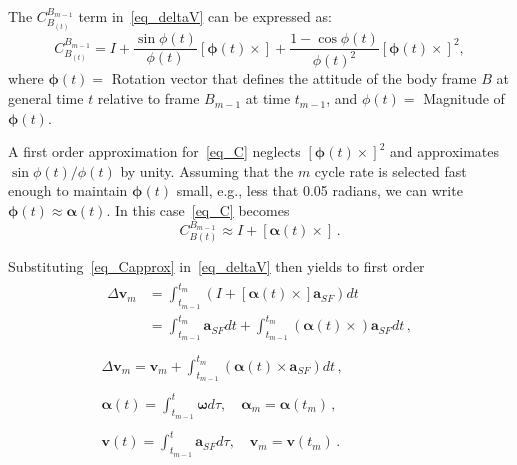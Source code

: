 \documentclass[journal]{IEEEtran}
\begin{document}
The $C_{B_{(t)}}^{B_{m-1}}$ term in~\eqref{eq_deltaV} can be expressed as:
\begin{equation}\label{eq_C}
     C_{B_{(t)}}^{B_{m-1}}=I + \frac{\sin\phi(t)}{\phi(t)}\left[\boldsymbol{\phi}(t)\times\right]+\frac{1-\cos\phi(t)}{{\phi(t)}^2}{\left[\boldsymbol{\phi}(t)\times\right]}^2,
\end{equation}
where $\boldsymbol{\phi}(t)= $ Rotation vector that defines the attitude of the  body frame ${B}$
at general time $t$  relative to frame  ${B_{m-1}}$ at time $t_{m-1}$, and $\phi(t)=$ Magnitude  of $\boldsymbol{\phi}(t)$.\par
  A first order approximation for~\eqref{eq_C} neglects ${\left[\boldsymbol{\phi}(t)\times\right]}^2$ and approximates ${\sin\phi(t)}/{\phi(t)}$ by unity. Assuming that the $m$ cycle rate is selected fast enough to maintain $\boldsymbol{\phi}(t)$ small, e.g., less that 0.05 radians, we can write $\boldsymbol{\phi}(t) \approx  \boldsymbol{\alpha}(t) $. In this case~\eqref{eq_C} becomes
\begin{equation}\label{eq_Capprox}
     C_{B(t)}^{B_{m-1}}\approx I +\left[\boldsymbol{\alpha}(t)\times\right]\,.
\end{equation}

Substituting~\eqref{eq_Capprox}  in~\eqref{eq_deltaV} then yields to first order 
\begin{equation}\label{eq_deltaVapprox}
\begin{array}{c}
\begin{split}
\Delta\boldsymbol{v}_m &= 
\int_{t_{m-1}}^{t_m}\left(I +\left[\boldsymbol{\alpha}(t)\times\right] \boldsymbol{a}_{SF}\right)dt\\ 
&= \int_{t_{m-1}}^{t_m}{\boldsymbol{a}_{SF}dt} + \int_{t_{m-1}}^{t_m} \left(\boldsymbol{\alpha}(t)\times\right) \boldsymbol{a}_{SF}dt\,,
 \end{split}\\
\\
\Delta\boldsymbol{v}_m =\boldsymbol{v}_m +\int_{t_{m-1}}^{t_m}\left(\boldsymbol{\alpha}(t)\times \boldsymbol{a}_{SF}\right)dt\,, \\
\\
\boldsymbol{\alpha}(t) = \int_{t_{m-1}}^{t}\boldsymbol{\omega}d\tau, \quad \boldsymbol{\alpha}_m =  \boldsymbol{\alpha}(t_m)\,,\\
\\
\boldsymbol{v}(t)=\int_{t_{m-1}}^{t}{\boldsymbol{a}_{SF}d\tau} ,\quad \boldsymbol{v}_m =  \boldsymbol{v}(t_m)\,.
\end{array}
\end{equation}
\end{document}
